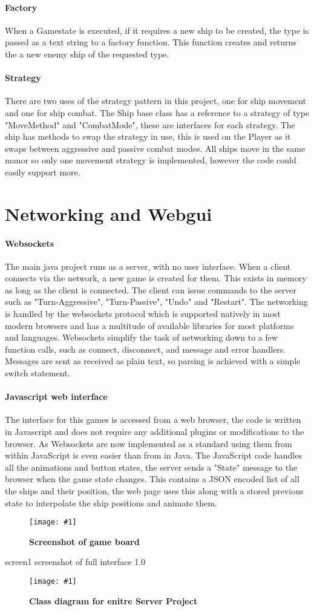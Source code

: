 \documentclass[conference]{acmsiggraph}
\newcommand{\figuremacroW}[4]{
	\begin{figure}[h] %
		\centering
		\texttt{[image: \#1]}
		\caption[#2]{\textbf{#2}}
		\label{fig:#1}
	\end{figure}
}
\newcommand{\figuremacroF}[4]{
	\begin{figure*}[h] %
		\centering
		\texttt{[image: \#1]}
		\caption[#2]{\textbf{#2}}
		\label{fig:#1}
	\end{figure*}
}
\begin{document}
\paragraph{Factory}
When a Gamestate is executed, if it requires a new ship to be created, the type is passed as a text string to a factory function. This function creates and returns the a new enemy ship of the requested type.

\paragraph{Strategy}
There are two uses of the strategy pattern in this project, one for ship movement and one for ship combat. The Ship base class has a reference to a strategy of type "MoveMethod" and "CombatMode", these are interfaces for each strategy. The ship has methods to swap the strategy in use, this is used on the Player as it swaps between aggressive and passive combat modes. All ships move in the same manor so only one movement strategy is implemented, however the code could easily support more.


\section{Networking and Webgui}

\paragraph{Websockets}
The main java project runs as a server, with no user interface. When a client connects via the network, a new game is created for them. This exists in memory as long as the client is connected. The client can issue commands to the server such as "Turn-Aggressive", "Turn-Passive", "Undo" and "Restart". The networking is handled by the websockets protocol which is supported natively in most modern browsers and has a multitude of available libraries for most platforms and languages. Websockets simplify the task of networking down to a few function calls, such as connect, disconnect, and  message and error handlers. Messages are sent as received as plain text, so parsing is achieved with a simple switch statement.

\paragraph{Javascript web interface}
The interface for this games is accessed from a web browser, the code is written in Javascript and does not require any additional plugins or modifications to the browser. As Websockets are now implemented as a standard using them from within JavaScript is even easier than from in Java. The JavaScript code handles all the animations and button states, the server sends a "State" message to the browser when the game state changes. This contains a JSON encoded list of all the ships and their position, the web page uses this along with a stored previous state to interpolate the ship positions and animate them.

\figuremacroW
{screen2}
{Screenshot of game board}
{1.0}


\figuremacroF
{screen1}
{screenshot of full interface}
{1.0}

\figuremacroF
{uml1}
{Class diagram for enitre Server Project}
{1.0}


\clearpage
\end{document}
